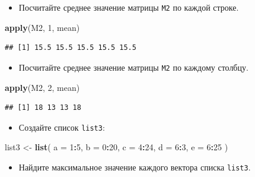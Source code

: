 \documentclass[]{book}
\newenvironment{Shaded}{\begin{snugshade}}{\end{snugshade}}
\newcommand{\KeywordTok}[1]{\textcolor[rgb]{0.13,0.29,0.53}{\textbf{#1}}}
\newcommand{\DataTypeTok}[1]{\textcolor[rgb]{0.13,0.29,0.53}{#1}}
\newcommand{\DecValTok}[1]{\textcolor[rgb]{0.00,0.00,0.81}{#1}}
\newcommand{\StringTok}[1]{\textcolor[rgb]{0.31,0.60,0.02}{#1}}
\newcommand{\OperatorTok}[1]{\textcolor[rgb]{0.81,0.36,0.00}{\textbf{#1}}}
\newcommand{\NormalTok}[1]{#1}
\providecommand{\tightlist}{%
  \setlength{\itemsep}{0pt}\setlength{\parskip}{0pt}}
\begin{document}
\begin{itemize}
\tightlist
\item
  Посчитайте среднее значение матрицы \texttt{M2} по каждой строке.
\end{itemize}

\begin{Shaded}
\begin{Highlighting}[]
\KeywordTok{apply}\NormalTok{(M2, }\DecValTok{1}\NormalTok{, mean)}
\end{Highlighting}
\end{Shaded}

\begin{verbatim}
## [1] 15.5 15.5 15.5 15.5 15.5
\end{verbatim}

\begin{itemize}
\tightlist
\item
  Посчитайте среднее значение матрицы \texttt{M2} по каждому столбцу.
\end{itemize}

\begin{Shaded}
\begin{Highlighting}[]
\KeywordTok{apply}\NormalTok{(M2, }\DecValTok{2}\NormalTok{, mean)}
\end{Highlighting}
\end{Shaded}

\begin{verbatim}
## [1] 18 13 13 18
\end{verbatim}

\begin{itemize}
\tightlist
\item
  Создайте список \texttt{list3}:
\end{itemize}

\begin{Shaded}
\begin{Highlighting}[]
\NormalTok{list3 <-}\StringTok{ }\KeywordTok{list}\NormalTok{(}
  \DataTypeTok{a =} \DecValTok{1}\OperatorTok{:}\DecValTok{5}\NormalTok{,}
  \DataTypeTok{b =} \DecValTok{0}\OperatorTok{:}\DecValTok{20}\NormalTok{,}
  \DataTypeTok{c =} \DecValTok{4}\OperatorTok{:}\DecValTok{24}\NormalTok{,}
  \DataTypeTok{d =} \DecValTok{6}\OperatorTok{:}\DecValTok{3}\NormalTok{,}
  \DataTypeTok{e =} \DecValTok{6}\OperatorTok{:}\DecValTok{25}
\NormalTok{  )}
\end{Highlighting}
\end{Shaded}

\begin{itemize}
\tightlist
\item
  Найдите максимальное значение каждого вектора списка \texttt{list3}.
\end{itemize}
\end{document}
